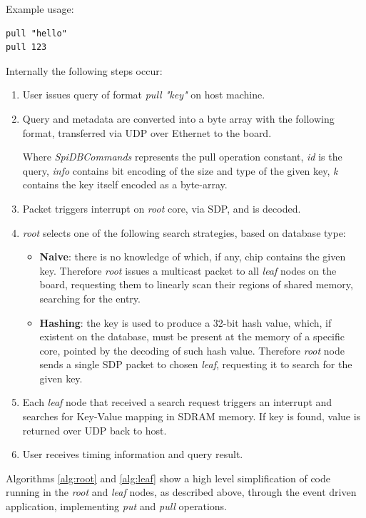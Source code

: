 Example usage:
\begin{lstlisting}
pull "hello"
pull 123
\end{lstlisting}

Internally the following steps occur:
\begin{enumerate}
\item User issues query of format \textit{pull "key"} on host machine.
\item Query and metadata are converted into a byte array with the following format, transferred via UDP over Ethernet to the board.

Where \textit{SpiDBCommands} represents the pull operation constant, \textit{id} is the query, \textit{info} contains bit encoding of the size and type of the given key, \textit{k} contains the key itself encoded as a byte-array.
\item Packet triggers interrupt on \textit{root} core, via SDP, and is decoded.
\item \textit{root} selects one of the following search strategies, based on database type:
\begin{itemize}
	\item \textbf{Naive}: there is no knowledge of which, if any, chip contains the given key. Therefore \textit{root} issues a multicast packet to all \textit{leaf} nodes on the board, requesting them to linearly scan their regions of shared memory, searching for the entry.
	\item \textbf{Hashing}: the key is used to produce a 32-bit hash value, which, if existent on the database, must be present at the memory of a specific core, pointed by the decoding of such hash value. Therefore \textit{root} node sends a single SDP packet to chosen \textit{leaf}, requesting it to search for the given key.
\end{itemize}
\item Each \textit{leaf} node that received a search request triggers an interrupt and searches for Key-Value mapping in SDRAM memory. If key is found, value is returned over UDP back to host.
\item User receives timing information and query result.
\end{enumerate}

Algorithms \ref{alg:root} and \ref{alg:leaf} show a high level simplification of code running in the \textit{root} and \textit{leaf} nodes, as described above, through the event driven application, implementing \textit{put} and \textit{pull} operations.


